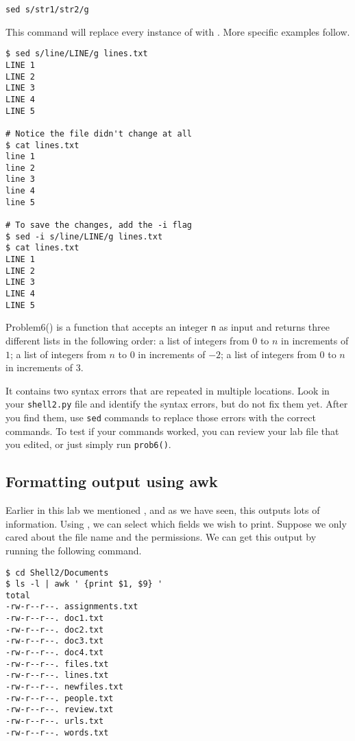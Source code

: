 \begin{lstlisting}
sed s/str1/str2/g
\end{lstlisting}

This command will replace every instance of  with . More specific examples follow.

\begin{lstlisting}
$ sed s/line/LINE/g lines.txt
LINE 1
LINE 2
LINE 3
LINE 4
LINE 5

# Notice the file didn't change at all
$ cat lines.txt
line 1
line 2
line 3
line 4
line 5

# To save the changes, add the -i flag
$ sed -i s/line/LINE/g lines.txt
$ cat lines.txt
LINE 1
LINE 2
LINE 3
LINE 4
LINE 5
\end{lstlisting}

\begin{problem}
Problem6() is a function that accepts an integer \texttt{n} as input and returns three different lists in the following order:
a list of integers from $0$ to $n$ in increments of $1$;
a list of integers from $n$ to $0$ in increments of $-2$;
a list of integers from $0$ to $n$ in increments of $3$.

It contains two syntax errors that are repeated in multiple locations.
Look in your \texttt{shell2.py} file and identify the syntax errors, but do not fix them yet.
After you find them, use \texttt{sed} commands to replace those errors with the correct commands.
To test if your commands worked, you can review your lab file that you edited, or just simply run \texttt{prob6()}. 
\end{problem}

\subsection*{Formatting output using awk} %

Earlier in this lab we mentioned , and as we have seen, this outputs lots of information.
Using , we can select which fields we wish to print.
Suppose we only cared about the file name and the permissions.
We can get this output by running the following command.

\begin{lstlisting}
$ cd Shell2/Documents
$ ls -l | awk ' {print $1, $9} '
total 
-rw-r--r--. assignments.txt
-rw-r--r--. doc1.txt
-rw-r--r--. doc2.txt
-rw-r--r--. doc3.txt
-rw-r--r--. doc4.txt
-rw-r--r--. files.txt
-rw-r--r--. lines.txt
-rw-r--r--. newfiles.txt
-rw-r--r--. people.txt
-rw-r--r--. review.txt
-rw-r--r--. urls.txt
-rw-r--r--. words.txt
\end{lstlisting}


